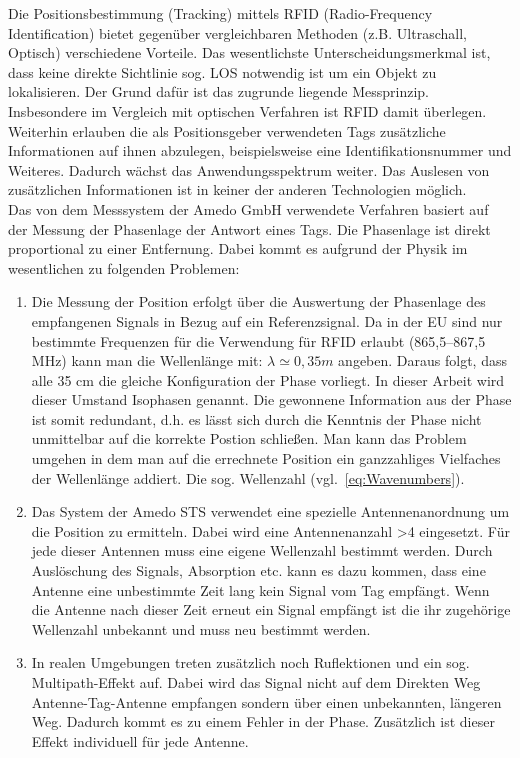 Die Positionsbestimmung (Tracking) mittels RFID (Radio-Frequency Identification) bietet gegenüber vergleichbaren Methoden (z.B. Ultraschall, Optisch) verschiedene Vorteile. Das wesentlichste Unterscheidungsmerkmal ist, dass keine direkte Sichtlinie sog. LOS notwendig ist um ein Objekt zu lokalisieren. Der Grund dafür ist das zugrunde liegende Messprinzip. Insbesondere im Vergleich mit optischen Verfahren ist RFID damit überlegen. Weiterhin erlauben die als Positionsgeber verwendeten Tags zusätzliche Informationen auf ihnen abzulegen, beispielsweise eine Identifikationsnummer und Weiteres. Dadurch wächst das Anwendungsspektrum weiter. Das Auslesen von zusätzlichen Informationen ist in keiner der anderen Technologien möglich.\\

Das von dem Messsystem der {Amedo GmbH} verwendete Verfahren basiert auf der Messung der Phasenlage der Antwort eines Tags. Die Phasenlage ist direkt proportional zu einer Entfernung. Dabei kommt es aufgrund der Physik im wesentlichen zu folgenden Problemen:
\begin{enumerate}
	\item Die Messung der Position erfolgt über die Auswertung der Phasenlage des empfangenen Signals in Bezug auf ein Referenzsignal. Da in der EU sind nur bestimmte Frequenzen für die Verwendung für RFID erlaubt (865,5–867,5 MHz) kann man die Wellenlänge mit: $ \lambda\simeq0,35 m $ angeben. Daraus folgt, dass alle 35 cm die gleiche Konfiguration der Phase vorliegt. In dieser Arbeit wird dieser Umstand Isophasen genannt. Die gewonnene Information aus der Phase ist somit redundant, d.h. es lässt sich durch die Kenntnis der Phase nicht unmittelbar auf die korrekte Postion schließen. Man kann das Problem umgehen in dem man auf die errechnete Position ein ganzzahliges Vielfaches der Wellenlänge addiert. Die sog. Wellenzahl (vgl.~\eqref{eq:Wavenumbers}).
	\item Das System der Amedo STS verwendet eine spezielle Antennenanordnung um die Position zu ermitteln. Dabei wird eine Antennenanzahl >4 eingesetzt. Für jede dieser Antennen muss eine eigene Wellenzahl bestimmt werden. Durch Auslöschung des Signals, Absorption etc. kann es dazu kommen, dass eine Antenne eine unbestimmte Zeit lang kein Signal vom Tag empfängt. Wenn die Antenne nach dieser Zeit erneut ein Signal empfängt ist die ihr zugehörige Wellenzahl unbekannt und muss neu bestimmt werden. 
	\item In realen Umgebungen treten zusätzlich noch Ruflektionen und ein sog. Multipath-Effekt auf. Dabei wird das Signal nicht auf dem Direkten Weg Antenne-Tag-Antenne empfangen sondern über einen unbekannten, längeren Weg. Dadurch kommt es zu einem Fehler in der Phase. Zusätzlich ist dieser Effekt individuell für jede Antenne.
\end{enumerate}

